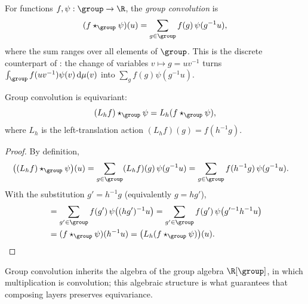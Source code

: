 \begin{definition}
\label{def:groups:group-conv-layer}
For functions $f, \psi: \group \to \R$, the \emph{group convolution} is
\begin{equation}
  (f \star_{\group} \psi)(u) = \sum_{g \in \group} f(g)\,\psi(g^{-1} u),
  \label{eq:groups:group-conv-discrete}
\end{equation}
where the sum ranges over all elements of $\group$. This is the discrete
counterpart of : the change of variables
$v \mapsto g = uv^{-1}$ turns $\int_{\group} f(uv^{-1})\psi(v)\,\Haar(v)$ into
$\sum_g f(g)\psi(g^{-1}u)$.
\end{definition}

\begin{theorem}
\label{thm:groups:group-conv-equivariance}
Group convolution is equivariant:
\begin{equation}
  (L_h f) \star_{\group} \psi = L_h (f \star_{\group} \psi),
\end{equation}
where $L_h$ is the left-translation action $(L_h f)(g) = f(h^{-1} g)$.
\end{theorem}

\begin{proof}
By definition,
\begin{align}
  \big((L_h f) \star_{\group} \psi\big)(u)
  &= \sum_{g \in \group} (L_h f)(g)\,\psi(g^{-1} u)
   = \sum_{g \in \group} f(h^{-1} g)\,\psi(g^{-1} u).
\end{align}
With the substitution $g' = h^{-1} g$ (equivalently $g = h g'$),
\begin{align}
  &= \sum_{g' \in \group} f(g')\,\psi\big((h g')^{-1} u\big)
   = \sum_{g' \in \group} f(g')\,\psi\big(g'^{-1} h^{-1} u\big) \\
  &= (f \star_{\group} \psi)(h^{-1} u)
   = \big(L_h (f \star_{\group} \psi)\big)(u). \qedhere
\end{align}
\end{proof}

Group convolution inherits the algebra of the group algebra $\R[\group]$, in
which multiplication is convolution; this algebraic structure is what guarantees
that composing layers preserves equivariance.

